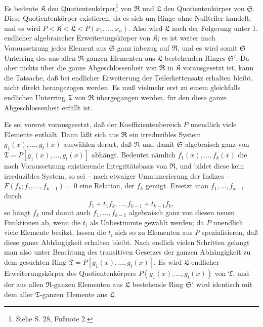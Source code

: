 Es bedeute $\mathfrak K$ den Quotientenkörper\footnote{Siehe S. 28, Fußnote 2.} von $\mathfrak R$ und $\mathfrak L$ den Quotientenkörper von $\mathfrak S$. Diese Quotientenkörper existieren, da es sich um Ringe ohne Nullteiler handelt; und es wird $P<\mathfrak K<\mathfrak L<P(x_1,\ldots,x_n)$. Also wird $\mathfrak L$ nach der Folgerung unter 1. endlicher algebraischer Erweiterungskörper von $\mathfrak K$; es ist weiter nach Voraussetzung jedes Element aus $\mathfrak S$ ganz inbezug auf $\mathfrak R$, und es wird somit $\mathfrak S$ Unterring des aus allen $\mathfrak R$-ganzen Elementen aus $\mathfrak L$ bestehenden Ringes $\mathfrak S'$. Da aber nichts über die ganze Abgeschlossenheit von $\mathfrak R$ in $\mathfrak K$ vorausgesetzt ist, kann die Tatsache, daß bei endlicher Erweiterung der Teilerkettensatz erhalten bleibt, nicht direkt herangezogen werden. Es muß vielmehr erst zu einem gleichfalls endlichen Unterring $\mathfrak T$ von $\mathfrak R$ übergegangen werden, für den diese ganze Abgeschlossenheit erfüllt ist.

Es sei vorerst vorausgesetzt, daß der Koeffizientenbereich $P$ unendlich viele Elemente enthält. Dann läßt sich aus $\mathfrak R$ ein irreduzibles System $g_1(x),\ldots,g_t(x)$ auswählen derart, daß $\mathfrak R$ und damit $\mathfrak S$ algebraisch ganz von $\mathfrak T=P[g_1(x),\ldots,g_t(x)]$ abhängt. Bedeutet nämlich $f_1(x),\ldots,f_k(x)$ die nach Voraussetzung existierende Integritätsbasis von $\mathfrak R$, und bildet diese kein irreduzibles System, so sei -- nach etwaiger Umnumerierung der Indizes -- $F(f_k;f_1,\ldots,f_{k-1})=0$ eine Relation, der $f_k$ genügt. Ersetzt man $f_1,\ldots,f_{k-1}$ durch
\[
 f_1+t_1f_k,\ldots,f_{k-1}+t_{k-1}f_k,
\]
so hängt $f_k$ und damit auch $f_1,\ldots,f_{k-1}$ algebraisch ganz von diesen neuen Funktionen ab, wenn die $t_i$ als Unbestimmte gewählt werden; da $P$ unendlich viele Elemente besitzt, lassen die $t_i$ sich so zu Elementen aus $P$ spezialisieren, daß diese ganze Abhängigkeit erhalten bleibt. Nach endlich vielen Schritten gelangt man also unter Beachtung des transitiven Gesetzes der ganzen Abhängigkeit zu dem gesuchten Ring $\mathfrak T=P[g_1(x),\ldots,g_t(x)]$. Es wird $\mathfrak L$ endlicher Erweiterungskörper des Quotientenkörpers $P(g_1(x),\ldots,g_t(x))$ von $\mathfrak T$, und der aus allen $\mathfrak R$-ganzen Elementen aus $\mathfrak L$ bestehende Ring $\mathfrak S'$ wird identisch mit dem aller $\mathfrak T$-ganzen Elemente aus $\mathfrak L$.

